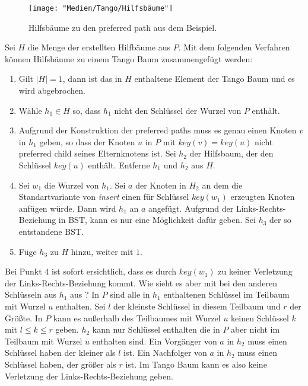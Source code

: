 \documentclass[a4paper,12pt]{article}
\begin{document}
\begin{figure}[h]
	\centering
	\texttt{[image: "Medien/Tango/Hilfsbäume"]}
	\caption{Hilfsbäume zu den preferred path aus dem Beispiel. }
	\label{fig:Hilfsbäume}
\end{figure}
Sei $H$ die Menge der erstellten Hilfbäume aus $P$. Mit dem folgenden Verfahren können Hilfsbäume zu einem Tango Baum zusammengefügt werden:
\begin{enumerate}
	\item Gilt $\vert H \vert = 1$, dann ist das in $H$ enthaltene Element der Tango Baum und es wird abgebrochen.
	\item Wähle $h_1 \in H$ so, dass $h_1$ nicht den Schlüssel der Wurzel von $P$ enthält.
	\item Aufgrund der Konstruktion der preferred paths muss es genau einen Knoten $v$ in $h_1$ geben, so dass der Knoten $u$ in $P$ mit $\mathit{key}\left(v\right) = \mathit{key}\left(u\right) $ nicht preferred child seines Elternknotens ist.
	Sei $h_2$ der Hilfsbaum, der den Schlüssel $\mathit{key}\left(u\right)$ enthält. Entferne $h_1$ und $h_2$ aus $H$.
	\item Sei $w_1$ die Wurzel von $h_1$. Sei $a$ der Knoten in $H_2$ an dem die Standartvariante von \textit{insert} einen für Schlüssel  $\mathit{key\left(w_1\right)}$ erzeugten Knoten anfügen würde. Dann wird $h_1$ an $a$ angefügt. Aufgrund der Links-Rechts-Beziehung in BST, kann es nur eine Möglichkeit dafür geben. Sei $h_3$ der so entstandene BST.
	\item Füge $h_3$ zu $H$ hinzu, weiter mit $1$.
\end{enumerate}

\noindent Bei Punkt $4$ ist sofort ersichtlich, dass es durch $\mathit{key}\left(w_1\right)$ zu keiner Verletzung der Links-Rechts-Beziehung kommt. Wie sieht es aber mit bei den anderen Schlüsseln aus $h_1$ aus ? 
In $P$ sind alle in $h_1$ enthaltenen Schlüssel im Teilbaum mit Wurzel $u$ enthalten. Sei $l$ der kleinste Schlüssel in diesem Teilbaum und $r$ der Größte. In $P$ kann es außerhalb des Teilbaumes mit Wurzel $u$ keinen Schlüssel $k$ mit $l \leq k \leq r$ geben. $h_2$ kann nur Schlüssel enthalten die in $P$ aber nicht im Teilbaum mit Wurzel $u$ enthalten sind. Ein Vorgänger von $a$ in $h_2$ muss einen Schlüssel haben der kleiner als $l$ ist. Ein Nachfolger von $a$ in $h_2$ muss einen Schlüssel haben, der größer als $r$ ist. Im Tango Baum kann es also keine Verletzung der Links-Rechts-Beziehung geben.\\
\end{document}
